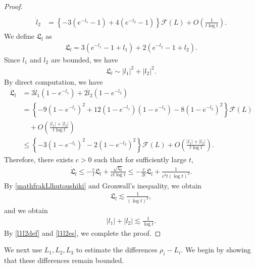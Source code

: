 \documentclass[10pt,a4paper]{amsart}
\numberwithin{equation}{section}
\begin{document}
\begin{proof}
\begin{align}
\begin{aligned}
\\
\dot{l}_2&=\left\{-3\left(e^{-l_1}-1\right)+4\left(e^{-l_2}-1\right)\right\}\mathcal{F}(L)+O\left(\frac{1}{t\log{t}}\right).
\end{aligned}
\end{align}
We define $\mathfrak{L}_l$ as 
\begin{align}\label{mathfrakLdef}
\mathfrak{L}_l=3\left(e^{-l_1}-1+l_1\right)+2\left(e^{-l_2}-1+l_2\right).
\end{align}
Since $l_1$ and $l_2$ are bounded, we have
\begin{align}\label{mathfrakLsim}
\mathfrak{L}_l\sim |l_1|^2+|l_2|^2.
\end{align}
By direct computation, we have
\begin{align*}
\dot{\mathfrak{L}}_l&=3\dot{l}_1\left(1-e^{-l_1}\right)+2\dot{l}_2\left(1-e^{-l_2}\right)
\\
&=\left\{-9\left(1-e^{-l_1}\right)^2+12\left(1-e^{-l_1}\right)\left(1-e^{-l_2}\right)-8\left(1-e^{-l_2}\right)^2\right\}\mathcal{F}(L)
\\
&\quad+O\left(\frac{|l_1|+|l_2|}{t\log{t}}\right)
\\
&\leq \left\{ -3\left(1-e^{-l_1}\right)^2-2\left(1-e^{-l_2}\right)^2\right\}\mathcal{F}(L)+O\left(\frac{|l_1|+|l_2|}{t\log{t}}\right).
\end{align*}
Therefore, there exists $c>0$ such that for sufficiently large $t$,
\begin{align}\label{mathfrakLlhutoushiki}
\dot{\mathfrak{L}}_l\leq-\frac{c}{t}\mathfrak{L}_l+\frac{\sqrt{\mathfrak{L}_l}}{ct\log{t}}\leq -\frac{c}{2t}\mathfrak{L}_l+\frac{1}{c^3t(\log{t})^2}.
\end{align}
By \eqref{mathfrakLlhutoushiki} and Gronwall's inequality, we obtain
\begin{align*}
\mathfrak{L}_l\lesssim \frac{1}{(\log{t})^2},
\end{align*}
and we obtain 
\begin{align}\label{l1l2es}
|l_1|+|l_2|\lesssim \frac{1}{\log{t}}.
\end{align}
By \eqref{l1l2def} and \eqref{l1l2es}, we complete the proof.
\end{proof}


We next use $L_1,L_2,L_3$ to estimate the differences $\rho_i-L_i$. We begin by showing that these differences remain bounded.
\end{document}
